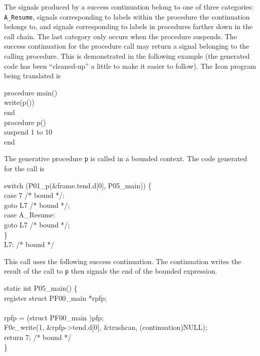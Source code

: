 The signals produced by a success continuation belong to one of three
categories: \texttt{A\_Resume}, signals corresponding to labels within the
procedure the continuation belongs to, and signals corresponding to
labels in procedures farther down in the call chain. The last category
only occurs when the procedure suspends. The success continuation for
the procedure call may return a signal belonging to the calling
procedure. This is demonstrated in the following example (the
generated code has been ``cleaned-up'' a little to make it easier to
follow).  The Icon program being translated is

\goodbreak
\begin{iconcode}
procedure main()\\
\>write(p())\\
end\\
procedure p()\\
\>suspend 1 to 10\\
end\\
\end{iconcode}


The generative procedure \texttt{p} is called in a bounded context. The code
generated for the call is

\goodbreak
\begin{iconcode}
switch (P01\_p(\&frame.tend.d[0], P05\_main)) \{\\
\>case 7 /* bound */:\\
\>\>goto L7 /* bound */;\\
\>case A\_Resume:\\
\>\>goto L7 /* bound */;\\
\>\}\\
L7: /* bound */\\
\end{iconcode}

\noindent
This call uses the following success continuation. The continuation
writes the result of the call to \texttt{p} then signals the end of the bounded
expression.

\goodbreak
\begin{iconcode}
static int P05\_main() \{\\
\>register struct PF00\_main *rpfp;\\
\\
\>rpfp = (struct PF00\_main )pfp;\\
\>F0c\_write(1, \&rpfp->tend.d[0], \&trashcan, (continuation)NULL);\\
\>return 7; /* bound */\\
\}\\
\end{iconcode}

